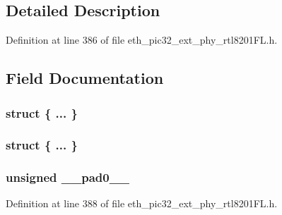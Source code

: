 \subsection{Detailed Description}


Definition at line 386 of file eth\+\_\+pic32\+\_\+ext\+\_\+phy\+\_\+rtl8201\+F\+L.\+h.



\subsection{Field Documentation}
\hypertarget{union___i_n_t___w_o_l___l_e_d_s__t_a93876ee723fc2baa65293029e2b3acad}{}\subsubsection[{"@152}]{\setlength{\rightskip}{0pt plus 5cm}struct \{ ... \} }\label{union___i_n_t___w_o_l___l_e_d_s__t_a93876ee723fc2baa65293029e2b3acad}
\hypertarget{union___i_n_t___w_o_l___l_e_d_s__t_a4474b1419b251fc6fa6573d192e51931}{}\subsubsection[{"@154}]{\setlength{\rightskip}{0pt plus 5cm}struct \{ ... \} }\label{union___i_n_t___w_o_l___l_e_d_s__t_a4474b1419b251fc6fa6573d192e51931}
\hypertarget{union___i_n_t___w_o_l___l_e_d_s__t_adf71f3d8410c1f1dbbc96680a92c49af}{}
\subsubsection[{\+\_\+\+\_\+pad0\+\_\+\+\_\+}]{\setlength{\rightskip}{0pt plus 5cm}unsigned \+\_\+\+\_\+pad0\+\_\+\+\_\+}\label{union___i_n_t___w_o_l___l_e_d_s__t_adf71f3d8410c1f1dbbc96680a92c49af}


Definition at line 388 of file eth\+\_\+pic32\+\_\+ext\+\_\+phy\+\_\+rtl8201\+F\+L.\+h.

\hypertarget{union___i_n_t___w_o_l___l_e_d_s__t_acaf2d0924a107ec6e8d2e31febaf66f9}{}
